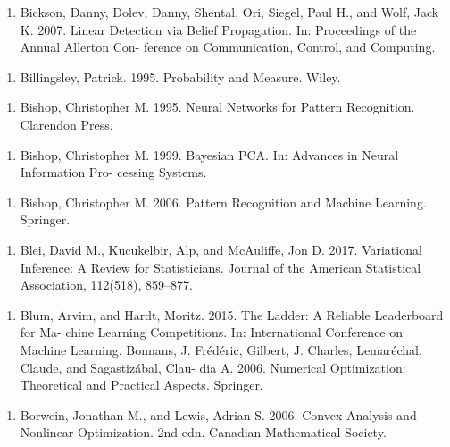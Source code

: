 \begin{enumerate}
\item Bickson, Danny, Dolev, Danny, Shental, Ori, Siegel, Paul H., and Wolf, Jack K. 2007. Linear Detection via Belief Propagation. In: Proceedings of the Annual Allerton Con- ference on Communication, Control, and Computing.
\end{enumerate}

\begin{enumerate}
\item Billingsley, Patrick. 1995. Probability and Measure. Wiley.
\end{enumerate}

\begin{enumerate}
\item Bishop, Christopher M. 1995. Neural Networks for Pattern Recognition. Clarendon Press.
\end{enumerate}

\begin{enumerate}
\item Bishop, Christopher M. 1999. Bayesian PCA. In: Advances in Neural Information Pro- cessing Systems.
\end{enumerate}

\begin{enumerate}
\item Bishop, Christopher M. 2006. Pattern Recognition and Machine Learning. Springer.
\end{enumerate}

\begin{enumerate}
\item Blei, David M., Kucukelbir, Alp, and McAuliffe, Jon D. 2017. Variational Inference: A Review for Statisticians. Journal of the American Statistical Association, 112(518), 859–877.
\end{enumerate}

\begin{enumerate}
\item Blum, Arvim, and Hardt, Moritz. 2015. The Ladder: A Reliable Leaderboard for Ma- chine Learning Competitions. In: International Conference on Machine Learning. Bonnans, J. Frédéric, Gilbert, J. Charles, Lemaréchal, Claude, and Sagastizábal, Clau- dia A. 2006. Numerical Optimization: Theoretical and Practical Aspects. Springer.
\end{enumerate}

\begin{enumerate}
\item Borwein, Jonathan M., and Lewis, Adrian S. 2006. Convex Analysis and Nonlinear Optimization. 2nd edn. Canadian Mathematical Society.
\end{enumerate}

